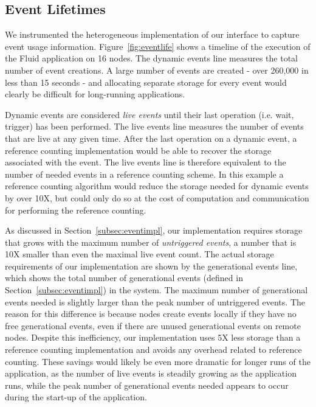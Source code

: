 \subsection{Event Lifetimes}
\label{subsec:eventlife}

We instrumented the heterogeneous implementation of our interface to 
capture event usage information.  Figure~\ref{fig:eventlife} shows
a timeline of the execution of the Fluid application on 16 nodes.
The dynamic events line measures the total number of event creations.
A large number of events are created - over 260,000 in less than 15
seconds - and allocating separate storage for every event would clearly
be difficult for long-running applications.  

Dynamic events are considered {\em live events} until their last operation 
(i.e. wait, trigger) has been performed.  The live events line
measures the number of events that are live at any given time.  After
the last operation on a dynamic event, a reference counting implementation would
be able to recover the storage associated with the event.  The live events line
is therefore equivalent to the number of needed events in a reference counting
scheme.  In this example 
a reference counting algorithm would reduce the storage needed for dynamic events
by over 10X, but could only do so at the cost of
computation and communication for performing the reference counting.  

As discussed in Section~\ref{subsec:eventimpl}, our implementation
requires storage that grows with the maximum number of {\em untriggered events}, a number
that is 10X smaller than even the maximal live event count.  The actual storage
requirements of our implementation are shown by the generational events line,
which shows the total number of generational events (defined in Section~\ref{subsec:eventimpl}) 
in the system.
The maximum number of generational events needed is slightly larger than the peak number of untriggered events. 
The reason for this difference is because nodes create events locally if they have
no free generational events, even if there are unused generational events on remote nodes.
Despite this inefficiency, our implementation uses 5X less storage
than a reference counting implementation and avoids any overhead related to 
reference counting.  These savings would likely be even more dramatic for longer 
runs of the application, as the number of live events is steadily growing as the
application runs, while the peak number of generational events needed appears to 
occur during the start-up of the application.

